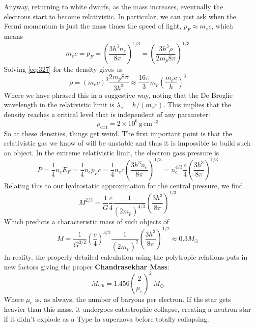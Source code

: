 \documentclass[10pt]{article}
\numberwithin{equation}{section}
\newcommand{\n}{\noindent}
\begin{document}
    \n Anyway, returning to white dwarfs, as the mass increases,
    eventually the electrons start to become relativistic. In
    particular, we can just ask when the Fermi momentum is just the
    mass times the speed of light, $p_F\approx m_ec$, which means
    \begin{equation}
      \label{eq:327}
      m_ec=p_F=\left(\frac{3h^3n_e}{8\pi}\right)^{1/3}=\left(\frac
{3h^3\rho}{2m_p8\pi}\right)^{1/3}
    \end{equation}
    Solving \eqref{eq:327} for the density gives us
    \begin{equation}
      \label{eq:328}
      \rho= (m_e c)^3\frac{2m_p 8\pi}{3 h^3}\approx \frac{16
        \pi}{3}m_p\left(\frac{m_e c}{h}\right)^3
    \end{equation}
    Where we have phrased this in a suggestive way, noting that the De
    Broglie wavelength in the relativistic limit is
    $\lambda_c=h/(m_ec)$. This implies that the density reaches a
    critical level that is independent of any parameter:
    \begin{equation}
      \label{eq:329}
      \boxed{\rho_{\mathrm{crit}}=2\times 10^6\,\mathrm{g\,cm^{-3}}}
    \end{equation}
    So at these densities, things get weird. The first important point
    is that the relativistic gas we know of will be unstable and thus
    it is impossible to build such an object. In the extreme
    relativistic limit, the electron gass pressure is
    \begin{equation}
      \label{eq:330}
      P=\frac{1}{4}n_e E_F=\frac{1}{4}n_e p_F c=\frac{1}{4} n_ec\left(\frac
{3h^3n_e}{8\pi}\right)^{1/3}=n_e^{4/3}\frac{c}{4}\left(\frac{3h^3}{8\pi}
\right)^{1/3}
    \end{equation}
    Relating this to our hydrostatic approximation for the central
    pressure, we find
    \begin{equation}
      \label{eq:331}
      M^{2/3}=\frac{1}{G}\frac{c}{4}\frac{1}{(2m_p)^{4/3}}\left(\frac{3h^3}
{8\pi}\right)^{1/3}
    \end{equation}
    Which predicts a characteristic mass of such objects of
    \begin{equation}
      \label{eq:332}
      M=\frac{1}{G^{3/2}}\left(\frac{c}{4}\right)^{3/2}\frac{1}{(2m_p)
^2}\left(\frac{3h^3}{8\pi}\right)^{1/2}
      \approx 0.3 M_\odot
    \end{equation}
    In reality, the properly detailed calculation using the polytropic
    relations puts in new factors giving the proper
    \textbf{Chandrasekhar Mass}:
    \begin{equation}
      \label{eq:333}
      \boxed{M_{\mathrm{Ch}}=1.456\left(\frac{2}{\mu_e}\right)^2\,M_\odot}
    \end{equation}
    Where $\mu_e$ is, as always, the number of baryons per electron.
    If the star gets heavier than this mass, it undergoes catastrophic
    collapse, creating a neutron star if it didn't explode as a Type Ia
    supernova before totally collapsing.\\
    
\end{document}
